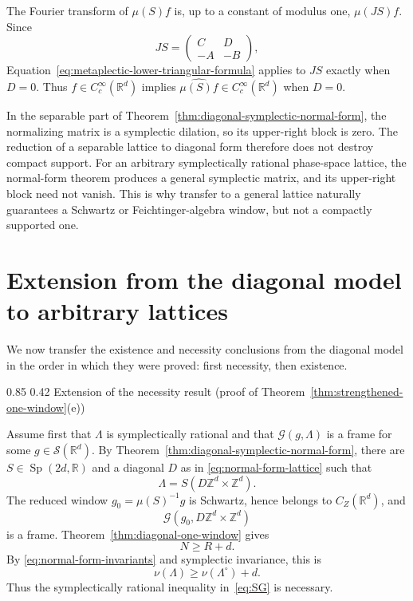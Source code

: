 \documentclass[11pt,reqno]{amsart}
\makeatletter
\numberwithin{equation}{section}
\renewcommand\subsection{\@startsection{subsection}{2}{\z@}%
  {0.85\baselineskip \@plus 0.25\baselineskip \@minus 0.10\baselineskip}%
  {0.42\baselineskip}%
  {\normalfont\bfseries}}
\theoremstyle{definition}
\theoremstyle{remark}
\newcommand{\R}{\mathbb R}
\newcommand{\Z}{\mathbb Z}
\newcommand{\G}{\mathcal G}
\newcommand{\Sclass}{\mathcal S}
\newcommand{\Sp}{\operatorname{Sp}}
\newcommand{\CZ}{C_Z}
\makeatother
\begin{document}
The Fourier transform of $\mu(S)f$ is, up to a constant of modulus one,
$\mu(JS)f$.  Since
\[
 JS=\begin{pmatrix}C&D\\-A&-B\end{pmatrix},
\]
Equation~\eqref{eq:metaplectic-lower-triangular-formula} applies to $JS$
exactly when $D=0$.  Thus $f\in C_c^\infty(\R^d)$ implies
$\widehat{\mu(S)f}\in C_c^\infty(\R^d)$ when $D=0$.

In the separable part of
Theorem~\ref{thm:diagonal-symplectic-normal-form}, the normalizing matrix is
a symplectic dilation, so its upper-right block is zero.  The reduction of a
separable lattice to diagonal form therefore does not destroy compact
support.  For an arbitrary symplectically rational phase-space lattice, the
normal-form theorem produces a general symplectic matrix, and its upper-right
block need not vanish.  This is why transfer to a general lattice naturally
guarantees a Schwartz or Feichtinger-algebra window, but not a compactly
supported one.

\section{Extension from the diagonal model to arbitrary lattices}
\label{sec:gabor-necessity}

We now transfer the existence and necessity conclusions from the diagonal
model in the order in which they were proved: first necessity, then existence.

\subsection{Extension of the necessity result (proof of Theorem~\ref{thm:strengthened-one-window}\textup{(e)})}

Assume first that $\Lambda$ is symplectically rational and that
$\G(g,\Lambda)$ is a frame for some $g\in\Sclass(\R^d)$.  By
Theorem~\ref{thm:diagonal-symplectic-normal-form}, there are
$S\in\Sp(2d,\R)$ and a diagonal $D$ as in
\eqref{eq:normal-form-lattice} such that
\begin{equation}\label{eq:rational-diagonal-reduction}
                  \Lambda=S(D\Z^d\times\Z^d).
\end{equation}
The reduced window $g_0=\mu(S)^{-1}g$ is Schwartz, hence belongs to
$\CZ(\R^d)$, and
\[
                 \G(g_0,D\Z^d\times\Z^d)
\]
is a frame.  Theorem~\ref{thm:diagonal-one-window} gives
\begin{equation}\label{eq:rational-NR-gap}
                              N\ge R+d.
\end{equation}
By \eqref{eq:normal-form-invariants} and symplectic invariance, this is
\begin{equation}\label{eq:rational-SG-necessary}
                   \nu(\Lambda)\ge\nu(\Lambda^\circ)+d.
\end{equation}
Thus the symplectically rational inequality in~\eqref{eq:SG} is necessary.
\end{document}
